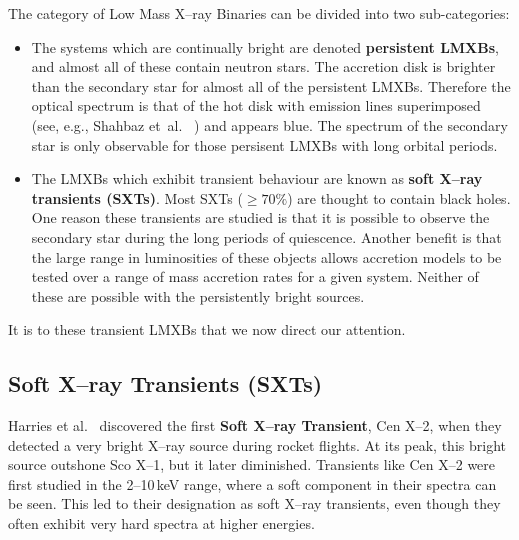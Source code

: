 \vspace{\myparskip}

The category of Low Mass X--ray Binaries can be divided into two
sub-categories:

\begin{itemize}
\item %
The systems which are continually bright are denoted
\textbf{persistent LMXBs}, and almost all of these contain neutron stars. %
The accretion disk is brighter than the secondary star for almost all of the persistent
LMXBs. Therefore the optical spectrum is that of the hot disk with emission lines superimposed (see, e.g., Shahbaz et~al.\ %
%
) and appears blue. The spectrum of the secondary star is only
observable for those persisent LMXBs with long orbital periods. %

\item %
The LMXBs which exhibit transient behaviour are known as \textbf{soft
X--ray transients (SXTs)}. Most SXTs ($\geq 70\%$) are thought to contain black holes.
One reason these transients are studied is that it is possible to observe the secondary star during the long periods of quiescence. Another benefit is that the large range in
luminosities of these objects allows accretion models to be tested
over a range of mass accretion rates for a given system. Neither of these are possible with the persistently bright sources. %


\end{itemize}
It is to these transient LMXBs that we now direct our attention. %



\subsection{Soft X--ray Transients (SXTs)}
\label{cha:Introduction:sec:X--rayBinaries:subsec:SXTs}

Harries et al.\ %
\citeyear{Harries_et_al.:1967} %
discovered the first \textbf{Soft X--ray Transient}, %
Cen X--2, when they detected a very bright X--ray source %
during rocket flights. %
At its peak, this bright source outshone Sco X--1, but it later
diminished. Transients like Cen X--2 were first studied in the 2--10\,keV range, where a
soft component in their spectra can be seen. This led to their
designation as soft X--ray transients, even though they often exhibit
very hard spectra at higher energies. %

